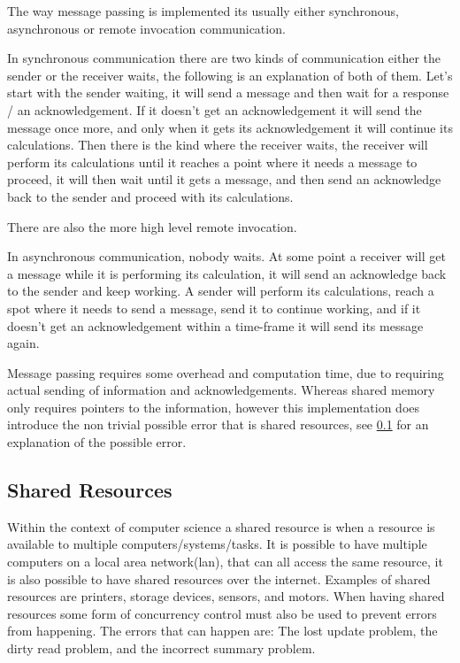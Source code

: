 The way message passing is implemented its usually either synchronous, asynchronous or remote invocation communication. 

In synchronous communication there are two kinds of communication either the sender or the receiver waits, the following is an explanation of both of them.
Let's start with the sender waiting, it will send a message and then wait for a response / an acknowledgement. If it doesn't get an acknowledgement it will send the message once more, and only when it gets its acknowledgement it will continue its calculations. 
Then there is the kind where the receiver waits, the receiver will perform its calculations until it reaches a point where it needs a message to proceed, it will then wait until it gets a message, and then send an acknowledge back to the sender and proceed with its calculations. 

There are also the more high level remote invocation.

In asynchronous communication, nobody waits. At some point a receiver will get a message while it is performing its calculation, it will send an acknowledge back to the sender and keep working. A sender will perform its calculations, reach a spot where it needs to send a message, send it to continue working, and if it doesn't get an acknowledgement within a time-frame it will send its message again.

Message passing requires some overhead and computation time, due to requiring actual sending of information and acknowledgements. Whereas shared memory only requires pointers to the information, however this implementation does introduce the non trivial possible error that is shared resources, see \ref{sharedReources} for an explanation of the possible error.



\subsection{\textbf{Shared Resources}}\label{sharedReources}
Within the context of computer science a shared resource is when a resource is available to multiple computers/systems/tasks. It is possible to have multiple computers on a local area network(lan), that can all access the same resource, it is also possible to have shared resources over the internet. Examples of shared resources are printers, storage devices, sensors, and motors.
When having shared resources some form of concurrency control must also be used to prevent errors from happening. The errors that can happen are: The lost update problem, the dirty read problem, and the incorrect summary problem.

